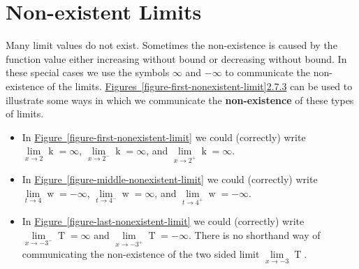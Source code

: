 \documentclass[12pt,]{book}
\newcommand{\terminology}[1]{\textbf{#1}}
\theoremstyle{plain}
\theoremstyle{definition}
\numberwithin{equation}{section}
\newcommand{\fe}[2]{\mathop{{#1}{\left(#2\right)}}}
\begin{document}
\section[Non-existent Limits]{Non-existent Limits}\label{section-nonexistent-limits}
Many limit values do not exist. Sometimes the non-existence is caused by the function value either increasing without bound or decreasing without bound. In these special cases we use the symbols \(\infty\) and \(-\infty\) to communicate the non-existence of the limits. \hyperref[figure-first-nonexistent-limit]{Figures~\ref*{figure-first-nonexistent-limit}}\textendash{}\hyperref[figure-last-nonexistent-limit]{2.7.3} can be used to illustrate some ways in which we communicate the \terminology{non-existence} of these types of limits.%
\begin{itemize}[label=\textbullet]
\item{}In \hyperref[figure-first-nonexistent-limit]{Figure~\ref*{figure-first-nonexistent-limit}} we could (correctly) write \(\lim\limits_{x\to2}\fe{k}{x}=\infty\), \(\lim\limits_{x\to2^{-}}\fe{k}{x}=\infty\), and \(\lim\limits_{x\to2^{+}}\fe{k}{x}=\infty\).\item{}In \hyperref[figure-middle-nonexistent-limit]{Figure~\ref*{figure-middle-nonexistent-limit}} we could (correctly) write \(\lim\limits_{t\to4}\fe{w}{t}=-\infty\), \(\lim\limits_{t\to4^{-}}\fe{w}{t}=\infty\), and \(\lim\limits_{t\to4^{+}}\fe{w}{t}=-\infty\).\item{}In \hyperref[figure-last-nonexistent-limit]{Figure~\ref*{figure-last-nonexistent-limit}} we could (correctly) write \(\lim\limits_{x\to-3^{-}}\fe{T}{x}=\infty\) and \(\lim\limits_{x\to-3^{+}}\fe{T}{x}=-\infty\). There is no shorthand way of communicating the non-existence of the two sided limit \(\lim\limits_{x\to-3}\fe{T}{x}\).\end{itemize}
\end{document}
